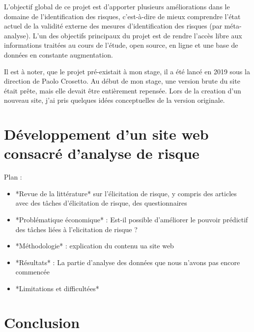 \documentclass[12pt]{article}
\begin{document}
L'objectif global de ce projet est d'apporter plusieurs améliorations
dans le domaine de l'identification des risques, c'est-à-dire de mieux
comprendre l'état actuel de la validité externe des mesures
d'identification des risques (par méta-analyse). L'un des objectifs
principaux du projet est de rendre l'accès libre aux informations
traitées au cours de l'étude, open source, en ligne et une base de
données en constante augmentation.

Il est à noter, que le projet pré-existait à mon stage, il a été lancé
en 2019 sous la direction de Paolo Crosetto. Au début de mon stage, une
version brute du site était prête, mais elle devait être entièrement
repensée. Lors de la creation d'un nouveau site, j'ai pris quelques
idées conceptuelles de la version originale.

\section{Développement d’un site web consacré d'analyse de risque}
\label{sec:fourth}

Plan :

\begin{itemize}
\item  *Revue de la littérature* sur l'élicitation de risque, y compris des articles avec des tâches d'élicitation de risque, des questionnaires

\item  *Problématique économique* : Est-il possible d'améliorer le pouvoir prédictif des tâches liées à l'elicitation de risque ?

\item *Méthodologie* : explication du contenu ua site web

\item *Résultats* : La partie d'analyse des données que nous n'avons pas encore commencée

\item *Limitations et difficultées*

\end{itemize}

\section{Conclusion}
\label{sec:fifth}



\end{document}
